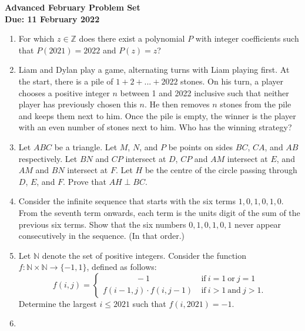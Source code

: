 \documentclass{article}
\newcommand*{\sptext}[1]{\ \text{#1}\ }
\begin{document}
\thispagestyle{empty}

\begin{center}
  \textbf{\Large Advanced February Problem Set}
  \\ \vspace{1em}
  \textbf{\large Due: 11 February 2022}
\end{center}

\bigskip

\begin{enumerate}[itemsep=\fill]

\item %
For which $z \in \mathbb{Z}$ does there exist a polynomial $P$ with integer coefficients such that $P(2021) = 2022$ and $P(z) = z$?


\item %
Liam and Dylan play a game, alternating turns with Liam playing first.
At the start, there is a pile of $1+2+...+2022$ stones.
On his turn, a player chooses a positive integer $n$ between 1 and 2022 inclusive such that neither player has previously chosen this $n$.
He then removes $n$ stones from the pile and keeps them next to him.
Once the pile is empty, the winner is the player with an even number of stones next to him.
Who has the winning strategy? 


\item %
Let $ABC$ be a triangle.
Let $M$, $N$, and $P$ be points on sides $BC$, $CA$, and $AB$ respectively.
Let $BN$ and $CP$ intersect at $D$, $CP$ and $AM$ intersect at $E$, and $AM$ and $BN$ intersect at $F$.
Let $H$ be the centre of the circle passing through $D$, $E$, and $F$.
Prove that $AH \perp BC$.


\item %
Consider the infinite sequence that starts with the six terms $1, 0, 1, 0, 1, 0$. From the seventh term onwards, each term is the units digit of the sum of the previous six terms. Show that the six numbers $0, 1, 0, 1, 0, 1$ never appear consecutively in the sequence. (In that order.)


\item %
Let $\mathbb{N}$ denote the set of positive integers. Consider the function $f: \mathbb{N} \times \mathbb{N} \to \{-1,1\}$, defined as follows: 
\[
  f(i,j) = \begin{cases}
    \mspace{72mu} -1 & \sptext{if} i=1 \sptext{or} j=1 \\
    f(i-1,j) \cdot f(i,j-1) & \sptext{if} i>1 \sptext{and} j>1.
  \end{cases}
\]
Determine the largest $i \leq 2021$ such that $f(i,2021) = -1$.


\item %

\end{enumerate}
\end{document}
